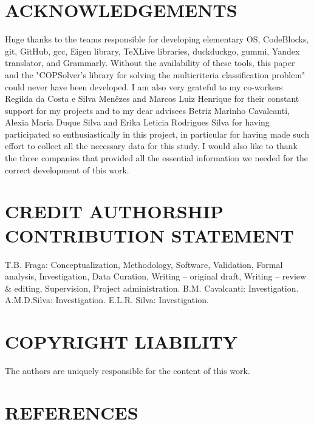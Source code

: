 \documentclass[10pt,fleqn,a4paper,twoside]{article}
\begin{document}
    \section{ACKNOWLEDGEMENTS}
    
Huge thanks to the teams responsible for developing elementary OS, CodeBlocks, git, GitHub, gcc, Eigen library, TeXLive libraries, duckduckgo, gummi, Yandex translator, and Grammarly. Without the availability of these tools, this paper and the "COPSolver's library for solving the multicriteria classification problem" could never have been developed. I am also very grateful to my co-workers Regilda da Costa e Silva Menêzes and Marcos Luiz Henrique for their constant support for my projects and to my dear advisees Betriz Marinho Cavalcanti, Alexia Maria Duque Silva and Erika Leticia Rodrigues Silva for having participated so enthusiastically in this project, in particular for having made such effort to collect all the necessary data for this study. I would also like to thank the three companies that provided all the essential information we needed for the correct development of this work.
        
        \section{CREDIT AUTHORSHIP CONTRIBUTION STATEMENT} 
		\label{sec:contributions}

		T.B. Fraga: Conceptualization, Methodology, Software, Validation, Formal analysis, Investigation, Data Curation, Writing – original draft, Writing – review \& editing, Supervision, Project administration. B.M. Cavalcanti: Investigation. A.M.D.Silva: Investigation. E.L.R. Silva: Investigation. 

    \section{COPYRIGHT LIABILITY}
    
        The authors are uniquely responsible for the content of this work.
        
    \section{REFERENCES}
    
        
        
        
\end{document}
